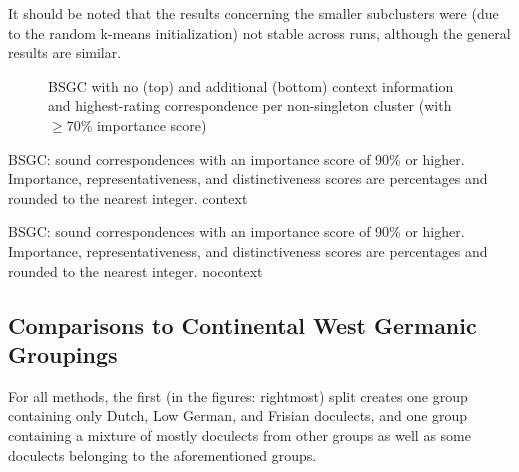 \documentclass[a4paper]{article}
\begin{document}
It should be noted that the results concerning
the smaller subclusters were
(due to the random k-means initialization) not stable
across runs, although the general results are similar.

\begin{figure}[h]
  \centering
%   
  

  \vspace{2em}
  
%   
  
  \caption{BSGC with no (top) and additional (bottom) context information and highest-rating correspondence per non-singleton cluster (with $\geq$70\% importance score)}
  \label{fig:bsgc-trees}
\end{figure}

\begin{table}[h]
\centering

\caption{BSGC: sound correspondences with an importance score of 90\% or higher.
Importance, representativeness, and distinctiveness scores are percentages and rounded to the nearest integer.
context}
\label{tab:bsgc-context-corres}
\end{table}

\begin{table}[h]
\centering

\caption{BSGC: sound correspondences with an importance score of 90\% or higher.
Importance, representativeness, and distinctiveness scores are percentages and rounded to the nearest integer.
nocontext}
\label{tab:bsgc-nocontext-corres}
\end{table}

\subsection{Comparisons to Continental West Germanic Groupings}

For all methods, the first (in the figures: rightmost) split
creates one group containing only Dutch, Low German, and Frisian doculects,
and one group containing a mixture of mostly doculects from other groups
as well as some doculects belonging to the aforementioned groups.

\end{document}
